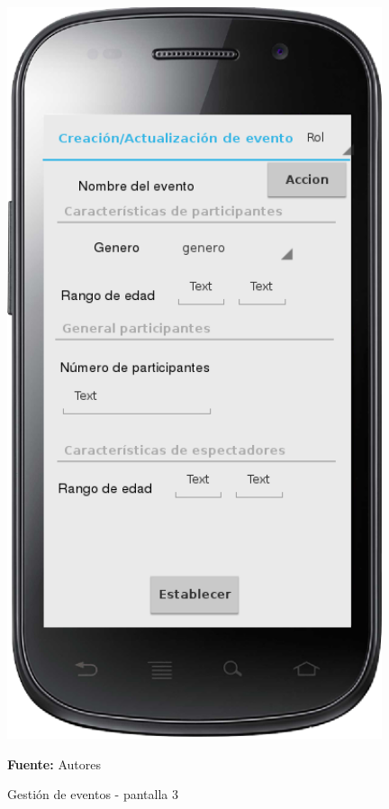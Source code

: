 \begin{figure}[!htb]
  \begin{center}
    \includegraphics[width=11cm]{./imagenes/UI/Eventos/gestion_eventos_3.png}
    \caption{Gestión de eventos - pantalla 3}
    \label{fig:gestion_eventos_3}
    \textbf{Fuente:}  Autores
  \end{center}
\end{figure}

